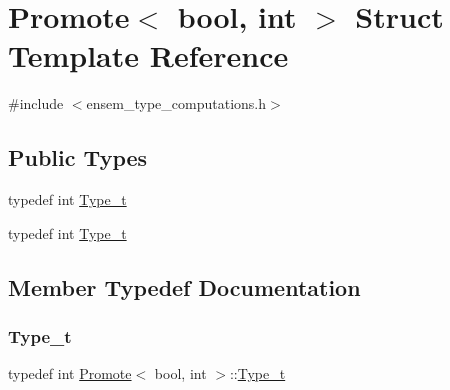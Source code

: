 \hypertarget{structPromote_3_01bool_00_01int_01_4}{}\section{Promote$<$ bool, int $>$ Struct Template Reference}
\label{structPromote_3_01bool_00_01int_01_4}


{\ttfamily \#include $<$ensem\+\_\+type\+\_\+computations.\+h$>$}

\subsection*{Public Types}
\begin{DoxyCompactItemize}
\item 
typedef int \mbox{\hyperlink{structPromote_3_01bool_00_01int_01_4_a7b27a2556c64a5b0f00d0a2fbac26b8a}{Type\+\_\+t}}
\item 
typedef int \mbox{\hyperlink{structPromote_3_01bool_00_01int_01_4_a7b27a2556c64a5b0f00d0a2fbac26b8a}{Type\+\_\+t}}
\end{DoxyCompactItemize}


\subsection{Member Typedef Documentation}
\mbox{\label{structPromote_3_01bool_00_01int_01_4_a7b27a2556c64a5b0f00d0a2fbac26b8a}} 
\subsubsection{\texorpdfstring{Type\_t}{Type\_t}\hspace{0.1cm}{\footnotesize\ttfamily [1/2]}}
{\footnotesize\ttfamily typedef int \mbox{\hyperlink{structPromote}{Promote}}$<$ bool, int $>$\+::\mbox{\hyperlink{structPromote_3_01bool_00_01int_01_4_a7b27a2556c64a5b0f00d0a2fbac26b8a}{Type\+\_\+t}}}

\mbox{\label{structPromote_3_01bool_00_01int_01_4_a7b27a2556c64a5b0f00d0a2fbac26b8a}} 
